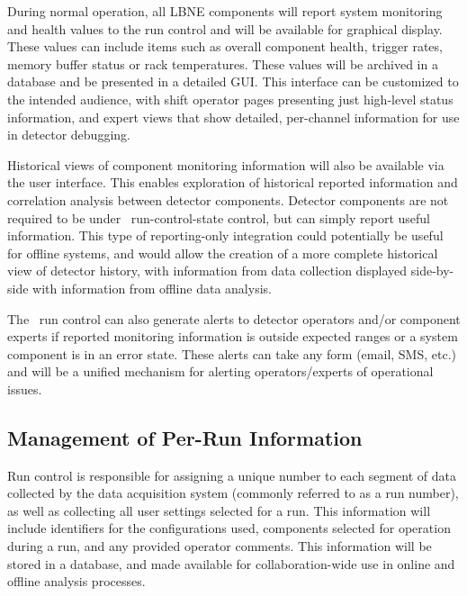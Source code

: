 During normal operation, all LBNE components will report system
monitoring and health values to the run control and will be
available for graphical display.  These values can include items such
as overall component health, trigger rates, memory buffer status or
rack temperatures.  These values will be archived in a database and be
presented in a detailed GUI.  This interface can
be customized to the intended audience, with shift operator pages
presenting just high-level status information, and expert views that
show detailed, per-channel information for use in detector debugging.

Historical views of component monitoring information will also be
available via the user interface.  This enables exploration of
historical reported information and correlation analysis between
detector components.  Detector components are not required to be under
\LBNE\ run-control-state control, but can simply report useful
information.  This type of reporting-only integration could
potentially be useful for offline systems, and would allow the
creation of a more complete historical view of detector history, with
information from data collection displayed side-by-side with
information from offline data analysis.

The \LBNE\ run control can also generate alerts to detector
operators and/or component experts if reported monitoring information
is outside expected ranges or a system component is in an error state.
These alerts can take any form (email, SMS, etc.) and will be a unified
mechanism for alerting operators/experts of operational issues.

\subsection{Management of Per-Run Information}

Run control is responsible for assigning a
unique number to each segment of data collected by the data acquisition
system (commonly referred to as a run number), as well as collecting
all user settings selected for a run.  This information will include
identifiers for the configurations used, components selected for operation
during a run, and any provided operator comments.  This information
will be stored in a database, and made available for
collaboration-wide use in online and offline analysis processes.

